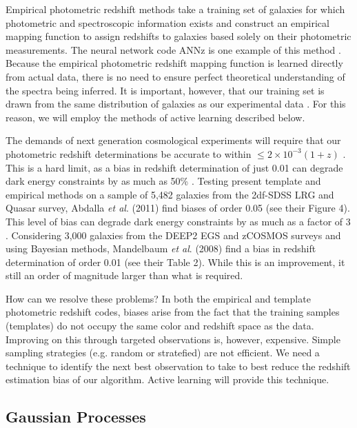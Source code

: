 \documentclass[prd, nofootinbib, floatfix, 12pt,tightenlines]{revtex4}
\begin{document}
Empirical photometric redshift methods take a training set of galaxies for
which photometric and spectroscopic information exists and construct an
empirical mapping function to assign redshifts to galaxies based solely on
their photometric measurements.  The neural network code ANNz is one example
of this method \cite{annz}.
Because the empirical photometric redshift mapping function is learned
directly from actual data, there is no need to ensure perfect theoretical
understanding of the spectra being inferred.  It is important, however, 
that our training set is drawn from the same distribution of galaxies
as our experimental data \cite{budavari2008,cunha2012}.  For this reason,
we will employ the methods of active learning described below. 

The demands of next generation cosmological experiments will require
that our photometric redshift determinations be accurate to within 
$\le 2\times 10^{-3}(1+z)$ \cite{desc}.  
This is a hard limit, as a bias in redshift
determination of just 0.01 can degrade dark energy constraints by as much as
50\% \cite{kitching,huterer2006,nakajima2011}.  Testing present template and
empirical methods on a sample of 5,482 galaxies 
from the 2df-SDSS LRG and Quasar survey,
Abdalla {\it et al}. (2011) find biases 
of order 0.05 (see their Figure 4).  
This level of bias can degrade
dark energy constraints by as much as a factor of 3 \cite{Ma2006}.  Considering
3,000 galaxies from the DEEP2 EGS and zCOSMOS surveys
and using Bayesian methods, Mandelbaum {\it et al}.
(2008) find a bias in redshift determination of order 0.01 
(see their Table 2).  While this is an improvement, it still an order of magnitude
larger than what is required.  

How can we resolve these problems?
In both the empirical and template photometric redshift codes, biases arise
from the fact that the training samples (templates) do
not occupy the same color and
redshift space as the data.  Improving on this through targeted observations is,
however, expensive.  Simple sampling strategies (e.g. random or stratefied) are not
efficient.  We need a technique to identify the next best 
observation to take to best
reduce the redshift estimation bias of our algorithm.  
Active learning will provide
this technique.

\subsection{Gaussian Processes}
\label{sec:gppz}
\end{document}

